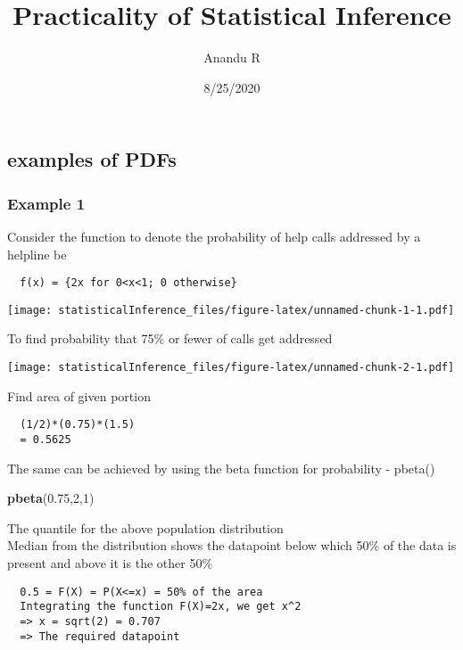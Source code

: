 \documentclass[
]{article}
\title{Practicality of Statistical Inference}
\author{Anandu R}
\date{8/25/2020}
\newenvironment{Shaded}{\begin{snugshade}}{\end{snugshade}}
\newcommand{\DecValTok}[1]{\textcolor[rgb]{0.00,0.00,0.81}{#1}}
\newcommand{\FloatTok}[1]{\textcolor[rgb]{0.00,0.00,0.81}{#1}}
\newcommand{\KeywordTok}[1]{\textcolor[rgb]{0.13,0.29,0.53}{\textbf{#1}}}
\newcommand{\NormalTok}[1]{#1}
\begin{document}
\maketitle

\hypertarget{examples-of-pdfs}{%
\subsection{examples of PDFs}\label{examples-of-pdfs}}

\hypertarget{example-1}{%
\subsubsection{Example 1}\label{example-1}}

Consider the function to denote the probability of help calls addressed
by a helpline be

\begin{verbatim}
  f(x) = {2x for 0<x<1; 0 otherwise}
\end{verbatim}

\texttt{[image: statisticalInference\_files/figure-latex/unnamed-chunk-1-1.pdf]}

To find probability that 75\% or fewer of calls get addressed

\texttt{[image: statisticalInference\_files/figure-latex/unnamed-chunk-2-1.pdf]}

Find area of given portion

\begin{verbatim}
  (1/2)*(0.75)*(1.5)
  = 0.5625
\end{verbatim}

The same can be achieved by using the beta function for probability -
pbeta()

\begin{Shaded}
\begin{Highlighting}[]
\KeywordTok{pbeta}\NormalTok{(}\FloatTok{0.75}\NormalTok{,}\DecValTok{2}\NormalTok{,}\DecValTok{1}\NormalTok{)}
\end{Highlighting}
\end{Shaded}

The quantile for the above population distribution\\
Median from the distribution shows the datapoint below which 50\% of the
data is present and above it is the other 50\%

\begin{verbatim}
  0.5 = F(X) = P(X<=x) = 50% of the area
  Integrating the function F(X)=2x, we get x^2
  => x = sqrt(2) = 0.707
  => The required datapoint
\end{verbatim}
\end{document}
